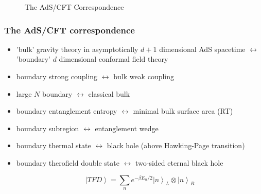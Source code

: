 \documentclass[10pt,aspectratio=169]{beamer}
\newcommand{\ket}[1]{\left| #1 \right>}
\begin{document}
\begin{frame}
\begin{minipage}[t]{0.48\linewidth}
\begin{figure}
\begin{center}
    \end{center}
    \caption{The AdS/CFT Correspondence}
\end{figure}

\end{minipage}

\end{frame}

\begin{frame}
\frametitle{The AdS/CFT correspondence}

\begin{minipage}[t]{0.48\linewidth}

\begin{itemize}

\item 'bulk' gravity theory in asymptotically $d+1$ dimensional AdS spacetime $\leftrightarrow$ 'boundary' $d$ dimensional conformal field theory

\item boundary strong coupling $\leftrightarrow$ bulk weak coupling

\item large $N$ boundary $\leftrightarrow$ classical bulk

\item boundary entanglement entropy $\leftrightarrow$ minimal bulk surface area (RT)

\item boundary subregion $\leftrightarrow$ entanglement wedge

\item boundary thermal state $\leftrightarrow$ black hole (above Hawking-Page transition)

\item boundary therofield double state $\leftrightarrow$ two-sided eternal black hole

$$\ket{TFD} = \sum_n e^{- \beta E_n / 2} \ket{n}_L \otimes \ket{n}_R$$

\end{itemize}

\end{minipage}
%
\hfill
%
\begin{minipage}[t]{0.48\linewidth}

\begin{figure}
    \begin{center}
    

\end{center}
\end{figure}
\end{minipage}
\end{frame}
\end{document}

